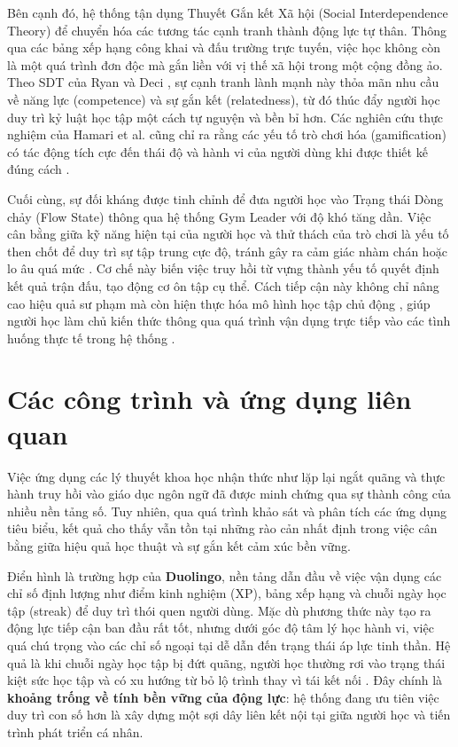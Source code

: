 Bên cạnh đó, hệ thống tận dụng Thuyết Gắn kết Xã hội (Social Interdependence Theory) \cite{Johnson2009} để chuyển hóa các tương tác cạnh tranh thành động lực tự thân. Thông qua các bảng xếp hạng công khai và đấu trường trực tuyến, việc học không còn là một quá trình đơn độc mà gắn liền với vị thế xã hội trong một cộng đồng ảo. Theo SDT của Ryan và Deci \cite{RyanDeci2017}, sự cạnh tranh lành mạnh này thỏa mãn nhu cầu về năng lực (competence) và sự gắn kết (relatedness), từ đó thúc đẩy người học duy trì kỷ luật học tập một cách tự nguyện và bền bỉ hơn. Các nghiên cứu thực nghiệm của Hamari et al. \cite{Hamari2014} cũng chỉ ra rằng các yếu tố trò chơi hóa (gamification) có tác động tích cực đến thái độ và hành vi của người dùng khi được thiết kế đúng cách \cite{Deterding2011}.

Cuối cùng, sự đối kháng được tinh chỉnh để đưa người học vào Trạng thái Dòng chảy (Flow State) \cite{Csikszentmihalyi1990} thông qua hệ thống Gym Leader với độ khó tăng dần. Việc cân bằng giữa kỹ năng hiện tại của người học và thử thách của trò chơi là yếu tố then chốt để duy trì sự tập trung cực độ, tránh gây ra cảm giác nhàm chán hoặc lo âu quá mức \cite{WerbachHunter2012}. Cơ chế này biến việc truy hồi từ vựng thành yếu tố quyết định kết quả trận đấu, tạo động cơ ôn tập cụ thể. Cách tiếp cận này không chỉ nâng cao hiệu quả sư phạm mà còn hiện thực hóa mô hình học tập chủ động \cite{Prince2004}, giúp người học làm chủ kiến thức thông qua quá trình vận dụng trực tiếp vào các tình huống thực tế trong hệ thống \cite{Nation2001}.
\section{Các công trình và ứng dụng liên quan}

Việc ứng dụng các lý thuyết khoa học nhận thức như lặp lại ngắt quãng và thực hành truy hồi vào giáo dục ngôn ngữ đã được minh chứng qua sự thành công của nhiều nền tảng số. Tuy nhiên, qua quá trình khảo sát và phân tích các ứng dụng tiêu biểu, kết quả cho thấy vẫn tồn tại những rào cản nhất định trong việc cân bằng giữa hiệu quả học thuật và sự gắn kết cảm xúc bền vững.

Điển hình là trường hợp của \textbf{Duolingo}, nền tảng dẫn đầu về việc vận dụng các chỉ số định lượng như điểm kinh nghiệm (XP), bảng xếp hạng và chuỗi ngày học tập (streak) để duy trì thói quen người dùng. Mặc dù phương thức này tạo ra động lực tiếp cận ban đầu rất tốt, nhưng dưới góc độ tâm lý học hành vi, việc quá chú trọng vào các chỉ số ngoại tại dễ dẫn đến trạng thái áp lực tinh thần. Hệ quả là khi chuỗi ngày học tập bị đứt quãng, người học thường rơi vào trạng thái kiệt sức học tập và có xu hướng từ bỏ lộ trình thay vì tái kết nối \cite{DuolingoBlog2024}. Đây chính là \textbf{khoảng trống về tính bền vững của động lực}: hệ thống đang ưu tiên việc duy trì con số hơn là xây dựng một sợi dây liên kết nội tại giữa người học và tiến trình phát triển cá nhân.

